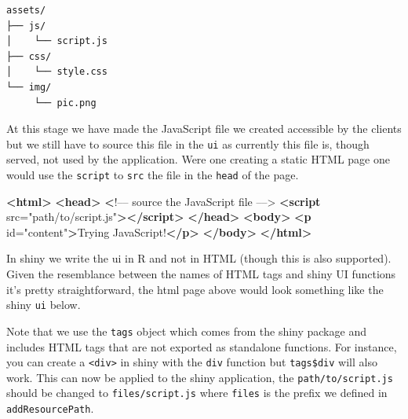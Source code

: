 \documentclass[
]{krantz}
\makeatletter
\newenvironment{Shaded}{\begin{snugshade}}{\end{snugshade}}
\newcommand{\DataTypeTok}[1]{\textcolor[rgb]{0.27,0.27,0.27}{#1}}
\newcommand{\ErrorTok}[1]{\textcolor[rgb]{0.14,0.14,0.14}{\textbf{#1}}}
\newcommand{\KeywordTok}[1]{\textcolor[rgb]{0.27,0.27,0.27}{\textbf{#1}}}
\newcommand{\NormalTok}[1]{#1}
\newcommand{\OperatorTok}[1]{\textcolor[rgb]{0.43,0.43,0.43}{\textbf{#1}}}
\newcommand{\OtherTok}[1]{\textcolor[rgb]{0.37,0.37,0.37}{#1}}
\newcommand{\StringTok}[1]{\textcolor[rgb]{0.5,0.5,0.5}{#1}}
\newenvironment{kframe}{%
\medskip{}
\setlength{\fboxsep}{.8em}
 \def\at@end@of@kframe{}%
 \ifinner\ifhmode%
  \def\at@end@of@kframe{\end{minipage}}%
  \begin{minipage}{\columnwidth}%
 \fi\fi%
 \def\FrameCommand##1{\hskip\@totalleftmargin \hskip-\fboxsep
 \colorbox{shadecolor}{##1}\hskip-\fboxsep
     \hskip-\linewidth \hskip-\@totalleftmargin \hskip\columnwidth}%
 \MakeFramed {\advance\hsize-\width
   \@totalleftmargin\z@ \linewidth\hsize
   \@setminipage}}%
 {\par\unskip\endMakeFramed%
 \at@end@of@kframe}
\renewenvironment{Shaded}{\begin{kframe}}{\end{kframe}}
\makeatother
\begin{document}
\begin{verbatim}
assets/
├── js/
│    └── script.js
├── css/
│    └── style.css
└── img/
     └── pic.png
\end{verbatim}

At this stage we have made the JavaScript file we created accessible by the clients but we still have to source this file in the \texttt{ui} as currently this file is, though served, not used by the application. Were one creating a static HTML page one would use the \texttt{script} to \texttt{src} the file in the \texttt{head} of the page.

\begin{Shaded}
\begin{Highlighting}[]
\KeywordTok{<html>}
  \KeywordTok{<head>}
    \ErrorTok{<}\NormalTok{!–– source the JavaScript file ––>}
    \KeywordTok{<script}\OtherTok{ src=}\StringTok{"path/to/script.js"}\KeywordTok{></script>}
  \KeywordTok{</head>}
  \KeywordTok{<body>}
    \KeywordTok{<p}\OtherTok{ id=}\StringTok{"content"}\KeywordTok{>}\NormalTok{Trying JavaScript!}\KeywordTok{</p>}
  \KeywordTok{</body>}
\KeywordTok{</html>}
\end{Highlighting}
\end{Shaded}

In shiny we write the ui in R and not in HTML (though this is also supported). Given the resemblance between the names of HTML tags and shiny UI functions it's pretty straightforward, the html page above would look something like the shiny \texttt{ui} below.

\begin{Shaded}
\end{Shaded}

Note that we use the \texttt{tags} object which comes from the shiny package and includes HTML tags that are not exported as standalone functions. For instance, you can create a \texttt{\textless{}div\textgreater{}} in shiny with the \texttt{div} function but \texttt{tags\$div} will also work. This can now be applied to the shiny application, the \texttt{path/to/script.js} should be changed to \texttt{files/script.js} where \texttt{files} is the prefix we defined in \texttt{addResourcePath}.
\end{document}
